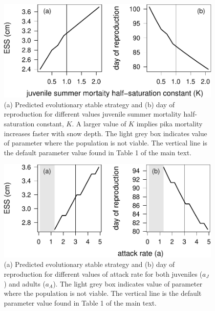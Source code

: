 \documentclass[12pt,]{article}
\begin{document}
\begin{figure}
\centering
\includegraphics{White_et_al_pika_phenology_supp_mat_files/figure-latex/unnamed-chunk-9-1.pdf}
\caption{(a) Predicted evolutionary stable strategy and (b) day of
reproduction for different values juvenile summer mortality
half-saturation constant, \(K\). A larger value of \(K\) implies pika
mortality increases faster with snow depth. The light grey box indicates
value of parameter where the population is not viable. The vertical line
is the default parameter value found in Table 1 of the main
text.\label{fig:ESS_vs_K}}
\end{figure}

\begin{figure}
\centering
\includegraphics{White_et_al_pika_phenology_supp_mat_files/figure-latex/unnamed-chunk-10-1.pdf}
\caption{(a) Predicted evolutionary stable strategy and (b) day of
reproduction for different values of attack rate for both juveniles
(\(a_J\)) and adults (\(a_A\)). The light grey box indicates value of
parameter where the population is not viable. The vertical line is the
default parameter value found in Table 1 of the main
text.\label{fig:ESS_vs_attack_rate}}
\end{figure}
\end{document}
